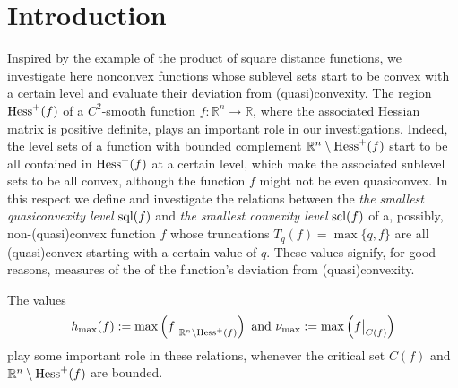 \documentclass[12pt,twoside,reqno]{amsart}
\theoremstyle{definition}
\numberwithin{equation}{section}
\begin{document}
\section{Introduction}
Inspired by the example of the product of square distance functions, we investigate here nonconvex functions whose 
sublevel sets start to be convex with a certain level and evaluate their deviation from (quasi)convexity. The region ${\rm Hess}^+(f)$ of a $C^2$-smooth function 
$f\!:\!\mathbb{R}^n\!\!\rightarrow\!\mathbb{R}$, where the associated Hessian matrix is positive definite, plays an important role in our investigations. 
Indeed, the level sets of a function with bounded complement $\mathbb{R}^n\setminus {\rm Hess}^+(f)$ start to be all contained in ${\rm Hess}^+(f)$ at a certain level, 
which make the associated sublevel sets to be all convex, although the function $f$ might not be even quasiconvex. In this respect we define and investigate the relations 
between the {\em the smallest quasiconvexity level} ${\rm sql}(f)$ and {\em the smallest convexity level} ${\rm scl}(f)$ of a, possibly, 
non-(quasi)convex function $f$ whose truncations $T_q(f)=\max\{q,f\}$  are all (quasi)convex starting with a certain value of $q$. These values signify, for good reasons, measures of the of the function's deviation from (quasi)convexity. 

The values
\[h_{\max}(f):=\max \left(f\big|_{\mathbb{R}^n\setminus {\rm Hess}^+(f)}\right)\mbox{ and }\nu_{\max}:=\max\left(f\big|_{C(f)}\right)\]  play some important role in these relations, whenever the critical set $C(f)$ and 
$\mathbb{R}^n\setminus {\rm Hess}^+(f)$ are bounded. 
\end{document}
